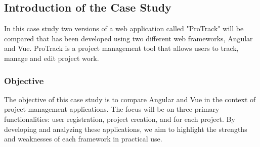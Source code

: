 \documentclass[conference]{IEEEtran}
\begin{document}






\subsection{Introduction of the Case Study}
In this case study two versions of a web application called "ProTrack" will be compared that has been developed using two different web frameworks, Angular and Vue. ProTrack is a project management tool that allows users to track, manage and edit project work.\newline
\subsubsection{Objective}
The objective of this case study is to compare Angular and Vue in the context of project management applications. The focus will be on three primary functionalities: user registration, project creation, and  for each project. By developing and analyzing these applications, we aim to highlight the strengths and weaknesses of each framework in practical use.
\newline
\end{document}
